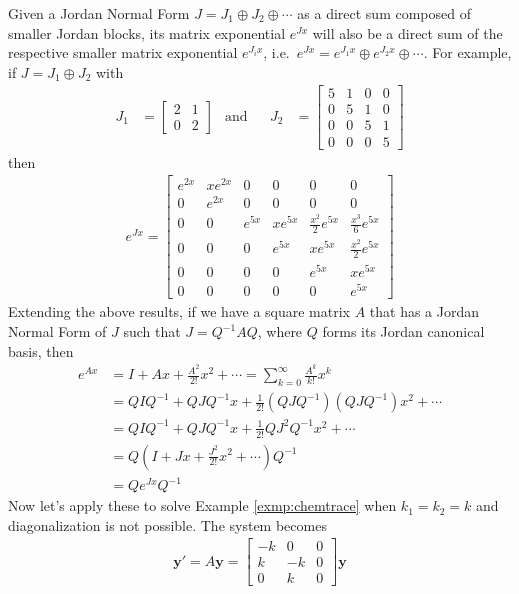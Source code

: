 Given a Jordan Normal Form $J = J_1 \oplus J_2 \oplus \cdots$ as a direct sum composed of smaller Jordan blocks, its matrix exponential $e^{Jx}$ will also be a direct sum of the respective smaller matrix exponential $e^{J_ix}$, i.e.\ $e^{Jx} = e^{J_1x} \oplus e^{J_2x} \oplus \cdots$. For example, if $J = J_1 \oplus J_2$ with
\begin{align*}
J_1 &= \begin{bmatrix}
2 & 1 \\
0 & 2
\end{bmatrix}
& \text{and} & & J_2 &=
\begin{bmatrix}
5 & 1 & 0 & 0 \\
0 & 5 & 1 & 0 \\
0 & 0 & 5 & 1 \\
0 & 0 & 0 & 5
\end{bmatrix}
\end{align*}
then
\begin{align*}
e^{Jx} =
\begin{bmatrix}
e^{2x} & xe^{2x} & 0 & 0 & 0 & 0 \\
0 & e^{2x} & 0 & 0 & 0 & 0 \\
0 & 0 & e^{5x} & xe^{5x} & \frac{x^2}{2}e^{5x} & \frac{x^3}{6}e^{5x} \\
0 & 0 & 0 & e^{5x} & xe^{5x} & \frac{x^2}{2}e^{5x} \\
0 & 0 & 0 & 0 & e^{5x} & xe^{5x} \\
0 & 0 & 0 & 0 & 0 & e^{5x} 
\end{bmatrix}
\end{align*}
Extending the above results, if we have a square matrix $A$ that has a Jordan Normal Form of $J$ such that $J = Q^{-1}AQ$, where $Q$ forms its Jordan canonical basis, then
\begin{align}
e^{Ax} &= I + Ax + \frac{A^2}{2!}x^2 + \cdots = \sum_{k=0}^{\infty} \frac{A^k}{k!}x^k  \nonumber \\
&= QIQ^{-1} + QJQ^{-1}x + \frac{1}{2!}(QJQ^{-1})(QJQ^{-1})x^2 + \cdots \nonumber \\
&= QIQ^{-1} + QJQ^{-1}x + \frac{1}{2!}QJ^2Q^{-1}x^2 + \cdots \nonumber \\
&= Q(I + Jx + \frac{J^2}{2!}x^2 + \cdots)Q^{-1} \nonumber \\
&= Qe^{Jx}Q^{-1}
\end{align}
Now let's apply these to solve Example \ref{exmp:chemtrace} when $k_1 = k_2 = k$ and diagonalization is not possible. The system becomes
\begin{align*}
\textbf{y}'
= A\textbf{y} =
\begin{bmatrix}
-k & 0 & 0 \\
k & -k & 0 \\
0 & k & 0 
\end{bmatrix}
\textbf{y}
\end{align*}
